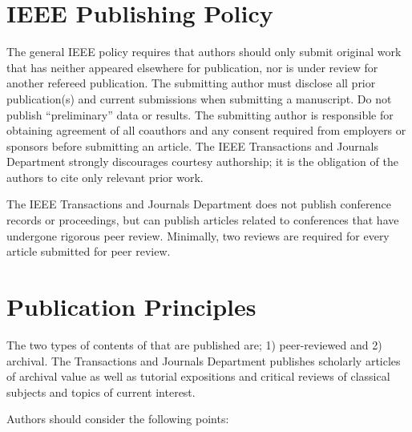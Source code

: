 \documentclass{IEEEtran}
\begin{document}
\section{IEEE Publishing Policy}
The general IEEE policy requires that authors should only submit original 
work that has neither appeared elsewhere for publication, nor is under 
review for another refereed publication. The submitting author must disclose 
all prior publication(s) and current submissions when submitting a 
manuscript. Do not publish ``preliminary'' data or results. The submitting 
author is responsible for obtaining agreement of all coauthors and any 
consent required from employers or sponsors before submitting an article. 
The IEEE Transactions and Journals Department strongly discourages courtesy 
authorship; it is the obligation of the authors to cite only relevant prior 
work.

The IEEE Transactions and Journals Department does not publish conference 
records or proceedings, but can publish articles related to conferences that 
have undergone rigorous peer review. Minimally, two reviews are required for 
every article submitted for peer review.

\section{Publication Principles}
The two types of contents of that are published are; 1) peer-reviewed and 2) 
archival. The Transactions and Journals Department publishes scholarly 
articles of archival value as well as tutorial expositions and critical 
reviews of classical subjects and topics of current interest. 

Authors should consider the following points:
\end{document}
